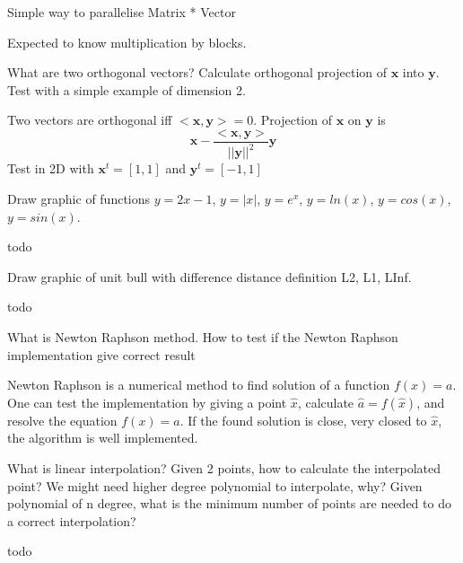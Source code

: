 \documentclass[answers]{exam}
\newcommand{\mathvec}[1]{\textbf{#1}}
\begin{document}
\begin{questions}
\question Simple way to parallelise Matrix * Vector
\begin{solution}[.2in]
Expected to know multiplication by blocks.
\end{solution}

\question What are two orthogonal vectors? Calculate orthogonal projection of $\mathvec{x}$ into $\mathvec{y}$. Test with a simple example of dimension 2. 
\begin{solution}[.2in]
Two vectors are orthogonal iff $<\mathvec{x},\mathvec{y}>=0$. Projection of $\mathvec{x}$ on $\mathvec{y}$ is
\[
\mathvec{x} - \frac{<\mathvec{x},\mathvec{y}>}{||\mathvec{y}||^2} \mathvec{y}
\]
Test in 2D with $\mathvec{x}^t=[1,1]$ and $\mathvec{y}^t=[-1,1]$
\end{solution}

\question Draw graphic of functions $y=2x-1$, $y=|x|$, $y=e^x$, $y=ln(x)$, $y=cos(x)$, $y=sin(x)$.
\begin{solution}[.2in]
	todo
\end{solution}

\question Draw graphic of unit bull with difference distance definition L2, L1, LInf.
\begin{solution}[.2in]
	todo
\end{solution}

\question What is Newton Raphson method. How to test if the Newton Raphson implementation give correct result
\begin{solution}[.2in]
Newton Raphson is a numerical method to find solution of a function $f(x)=a$. One can test the implementation by giving a point $\hat{x}$, calculate $\hat{a}=f(\hat{x})$, and resolve the equation $f(x)=\hat{a}$. If the found solution is close, very closed to $\hat{x}$, the algorithm is well implemented.
\end{solution}

\question What is linear interpolation? Given 2 points, how to calculate the interpolated point? We might need higher degree polynomial to interpolate, why? Given polynomial of n degree, what is the minimum number of points are needed to do a correct interpolation?
\begin{solution}[.2in]
	todo
\end{solution}


\end{questions}
\end{document}
